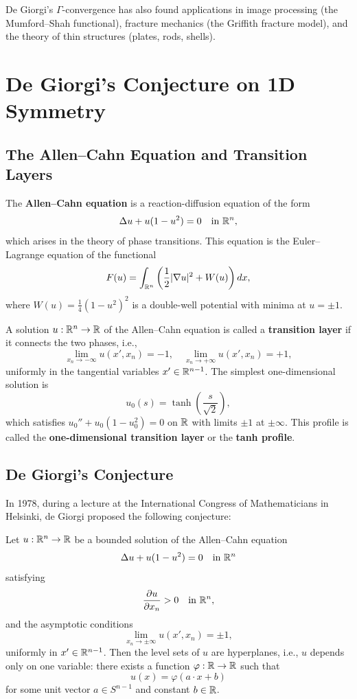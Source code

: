De Giorgi's \(\Gamma\)-convergence has also found applications in image processing (the Mumford--Shah functional), fracture mechanics (the Griffith fracture model), and the theory of thin structures (plates, rods, shells).

\section{De Giorgi's Conjecture on 1D Symmetry}

\subsection{The Allen--Cahn Equation and Transition Layers}

The \textbf{Allen--Cahn equation} is a reaction-diffusion equation of the form
\[
\Delta u + u(1-u^2) = 0 \quad \text{in } \mathbb{R}^n,
\]
which arises in the theory of phase transitions. This equation is the Euler--Lagrange equation of the functional
\[
F(u) = \int_{\mathbb{R}^n} \left( \frac{1}{2} |\nabla u|^2 + W(u) \right) dx,
\]
where \(W(u) = \frac{1}{4}(1-u^2)^2\) is a double-well potential with minima at \(u = \pm 1\).

A solution \(u: \mathbb{R}^n \to \mathbb{R}\) of the Allen--Cahn equation is called a \textbf{transition layer} if it connects the two phases, i.e.,
\[
\lim_{x_n \to -\infty} u(x',x_n) = -1, \quad
\lim_{x_n \to +\infty} u(x',x_n) = +1,
\]
uniformly in the tangential variables \(x' \in \mathbb{R}^{n-1}\). The simplest one-dimensional solution is
\[
u_0(s) = \tanh\left(\frac{s}{\sqrt{2}}\right),
\]
which satisfies \(u_0'' + u_0(1-u_0^2) = 0\) on \(\mathbb{R}\) with limits \(\pm 1\) at \(\pm \infty\). This profile is called the \textbf{one-dimensional transition layer} or the \textbf{tanh profile}.

\subsection{De Giorgi's Conjecture}

In 1978, during a lecture at the International Congress of Mathematicians in Helsinki, de Giorgi proposed the following conjecture:

\begin{condition}
Let \(u: \mathbb{R}^n \to \mathbb{R}\) be a bounded solution of the Allen--Cahn equation
\[
\Delta u + u(1-u^2) = 0 \quad \text{in } \mathbb{R}^n
\]
satisfying
\[
\frac{\partial u}{\partial x_n} > 0 \quad \text{in } \mathbb{R}^n,
\]
and the asymptotic conditions
\[
\lim_{x_n \to \pm \infty} u(x',x_n) = \pm 1,
\]
uniformly in \(x' \in \mathbb{R}^{n-1}\). Then the level sets of \(u\) are hyperplanes, i.e., \(u\) depends only on one variable: there exists a function \(\varphi: \mathbb{R} \to \mathbb{R}\) such that
\[
u(x) = \varphi(a \cdot x + b)
\]
for some unit vector \(a \in S^{n-1}\) and constant \(b \in \mathbb{R}\).
\end{condition}

